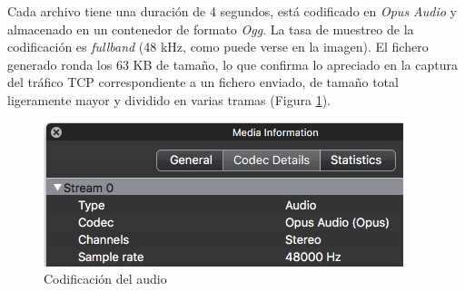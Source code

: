 Cada archivo tiene una duración de 4 segundos, está codificado en \emph{Opus Audio} \cite{OpusCodec} y almacenado en un contenedor de formato \emph{Ogg}. La tasa de muestreo de la codificación es \emph{fullband} (48 kHz, como puede verse en la imagen). El fichero generado ronda los 63 KB de tamaño, lo que confirma lo apreciado en la captura del tráfico TCP correspondiente a un fichero enviado, de tamaño total ligeramente mayor y dividido en varias tramas (Figura \ref{audioInfo}).

\begin{figure}[!t]
\begin{center}
\includegraphics[width=0.75\linewidth]{./6_EvalEmpirica/Img/audioInfo.png}
\end{center}
\caption{Codificación del audio}
\label{audioInfo}
\end{figure}